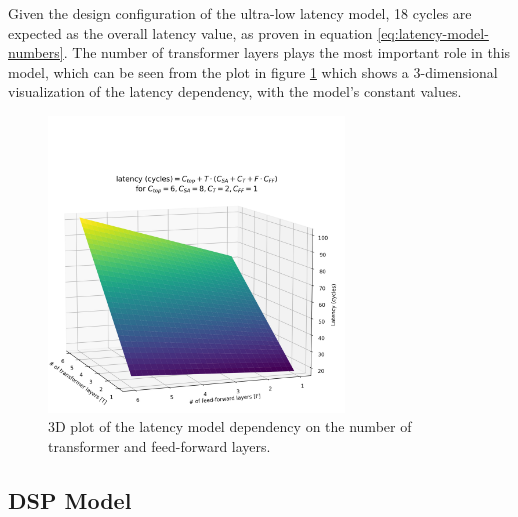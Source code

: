 Given the design configuration of the ultra-low latency model, 18 cycles are expected as the overall latency value, as proven in equation \ref{eq:latency-model-numbers}. The number of transformer layers plays the most important role in this model, which can be seen from the plot in figure \ref{fig:latency-model} which shows a 3-dimensional visualization of the latency dependency, with the model's constant values.

\begin{figure}[hpt!]
  \centering
  \includegraphics[trim={0cm 0cm 0cm 4cm}, clip, width=0.7\textwidth, center]{../logs/latency_model.png}
  \caption{3D plot of the latency model dependency on the number of transformer and feed-forward layers.}
  \label{fig:latency-model}
\end{figure}

\subsection{DSP Model}
\indo{|}
\indo{|}
\indo{|}



